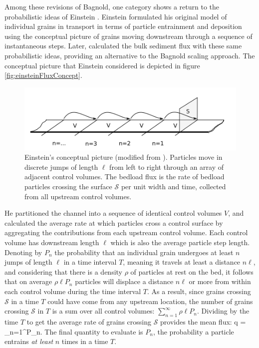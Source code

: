 Among these revisions of Bagnold, one category shows a return to the probabilistic ideas of Einstein \citep{Parker2003,Ancey2006}.
Einstein formulated his original model of individual grains in transport \citep{Einstein1937} in terms of particle entrainment and deposition using the conceptual picture of grains moving downstream through a sequence of instantaneous steps.
Later, \citet{Einstein1942,Einstein1950} calculated the bulk sediment flux with these same probabilistic ideas, providing an alternative to the Bagnold scaling approach.
The conceptual picture that Einstein considered is depicted in figure \ref{fig:einsteinFluxConcept}.
 \begin{figure}[!htbp]
	\includegraphics[width=\linewidth,keepaspectratio]{./figures/ch1/yalinDrawing.png}
	\caption{Einstein’s conceptual picture (modified from \citet{Yalin1972}). Particles move in discrete jumps of length $\ell$ from
left to right through an array of adjacent control volumes. The bedload flux is the rate of bedload particles crossing
the surface $\mathcal{S}$ per unit width and time, collected from all upstream control volumes.}
	\label{fig:lislefig}
\end{figure}

He partitioned the channel into a sequence of identical control volumes $V$, and calculated the average rate at which particles cross a control surface by aggregating the contributions from each upstream control volume.
Each control volume has downstream length $\ell$ which is also the average particle step length.
Denoting by $P_n$ the probability that an individual grain undergoes at least $n$ jumps of length $\ell$ in a time interval $T$, meaning it travels at least a distance $n \ell$, and considering that there is a density $\rho$ of particles at rest on the bed, it follows that on average $\rho \ell P_n$ particles will displace a distance $n \ell$ or more from within each control volume during the time interval $T$. 
As a result, since grains crossing $\mathcal{S}$ in a time $T$ could have come from any upstream location, the number of grains crossing $\mathcal{S}$ in $T$ is a sum over all control volumes: $\sum_{n=1}^\infty \rho \ell P_n$.
Dividing by the time $T$ to get the average rate of grains crossing $\mathcal{S}$ provides the mean flux:
\be q =  \sum_{n=1}^\infty P_n. \label{eq:einflux} \ee
The final quantity to evaluate is $P_n$, the probability a particle entrains \textit{at least} $n$ times in a time $T$.

